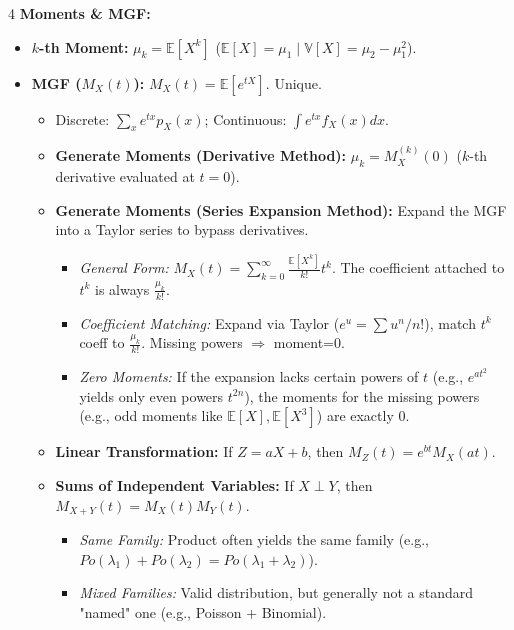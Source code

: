 \documentclass[9pt]{extarticle}
\begin{document}
\begin{multicols*}{4}
\textbf{Moments \& MGF:}
\begin{itemize}
    \item \textbf{$k$-th Moment:} $\mu_k = \mathbb{E}[X^k]$ ($\mathbb{E}[X] = \mu_1 \;|\; \mathbb{V}[X] = \mu_2 - \mu_1^2$).
    \item \textbf{MGF ($M_X(t)$):} $M_X(t) = \mathbb{E}[e^{tX}]$. Unique.
    \begin{itemize}
        \item Discrete: $\sum_x e^{tx} p_X(x)$; Continuous: $\int e^{tx} f_X(x) dx$.
        \item \textbf{Generate Moments (Derivative Method):} $\mu_k = M_X^{(k)}(0)$ ($k$-th derivative evaluated at $t=0$).
        \item \textbf{Generate Moments (Series Expansion Method):} Expand the MGF into a Taylor series to bypass derivatives.
        \begin{itemize}
            \item \textit{General Form:} $M_X(t) = \sum_{k=0}^{\infty} \frac{\mathbb{E}[X^k]}{k!} t^k$. The coefficient attached to $t^k$ is always $\frac{\mu_k}{k!}$.
            \item \textit{Coefficient Matching:} Expand via Taylor ($e^u = \sum u^n/n!$), match $t^k$ coeff to $\frac{\mu_k}{k!}$. Missing powers $\Rightarrow$ moment=0.
            \item \textit{Zero Moments:} If the expansion lacks certain powers of $t$ (e.g., $e^{at^2}$ yields only even powers $t^{2n}$), the moments for the missing powers (e.g., odd moments like $\mathbb{E}[X], \mathbb{E}[X^3]$) are exactly 0.
        \end{itemize}
        \item \textbf{Linear Transformation:} If $Z = aX + b$, then $M_Z(t) = e^{bt}M_X(at)$.
        \item \textbf{Sums of Independent Variables:} If $X \perp Y$, then $M_{X+Y}(t) = M_X(t)M_Y(t)$.
        \begin{itemize}
            \item \textit{Same Family:} Product often yields the same family (e.g., $Po(\lambda_1) + Po(\lambda_2) = Po(\lambda_1+\lambda_2)$).
            \item \textit{Mixed Families:} Valid distribution, but generally not a standard "named" one (e.g., Poisson + Binomial).
        \end{itemize}
    \end{itemize}
\end{itemize}


\end{multicols*}
\end{document}
